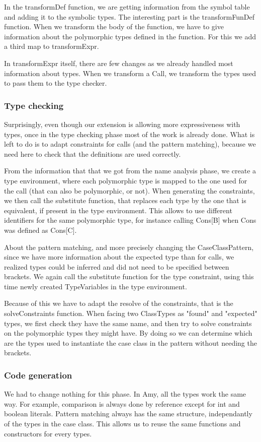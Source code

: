 In the transformDef function, we are getting information from the symbol table and adding it to the symbolic types. The interesting part is the transformFunDef function. When we transform the body of the function, we have to give information about the polymorphic types defined in the function. For this we add a third map to transformExpr.

In transformExpr itself, there are few changes as we already handled most information about types. When we transform a Call, we transform the types used to pass them to the type checker.
\subsubsection{Type checking}
Surprisingly, even though our extension is allowing more expressiveness with types, once in the type checking phase most of the work is already done. What is left to do is to adapt constraints for calls (and the pattern matching), because we need here to check that the definitions are used correctly. 

From the information that that we got from the name analysis phase, we create a type environment, where each polymorphic type is mapped to the one used for the call (that can also be polymorphic, or not). When generating the constraints, we then call the substitute function, that replaces each type by the one that is equivalent, if present in the type environment. This allows to use different identifiers for the same polymorphic type, for instance calling Cons[B] when Cons was defined as Cons[C].

About the pattern matching, and more precisely changing the CaseClassPattern, since we have more information about the expected type than for calls, we realized types could be inferred and did not need to be specified between brackets. We again call the substitute function for the type constraint, using this time newly created TypeVariables in the type environment. 

Because of this we have to adapt the resolve of the constraints, that is the solveConstraints function. When facing two ClassTypes as "found" and "expected" types, we first check they have the same name, and then try to solve constraints on the polymorphic types they might have. By doing so we can determine which are the types used to instantiate the case class in the pattern without needing the brackets.
\subsubsection{Code generation}
We had to change nothing for this phase. In Amy, all the types work the same way. For example, comparison is always done by reference except for int and boolean literals. Pattern matching always has the same structure, independantly of the types in the case class. This allows us to reuse the same functions and constructors for every types.
